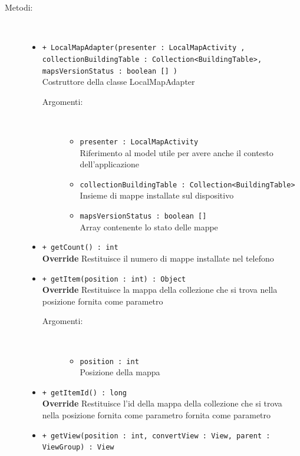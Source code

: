 \documentclass[../DefinizioneDiProdotto.tex]{subfiles}
\begin{document}
\begin{description}
\begin{itemize}
	\end{itemize}
	\item[Metodi:] \
	\begin{itemize}
		\item \texttt{+ LocalMapAdapter(presenter : LocalMapActivity ,\\ collectionBuildingTable : Collection<BuildingTable>,\\ mapsVersionStatus : boolean [] )}\\
		Costruttore della classe LocalMapAdapter
		\begin{description}
			\item[Argomenti:] \
			\begin{itemize}
				\item \texttt{presenter : LocalMapActivity }\\
				Riferimento al model utile per avere anche il contesto dell'applicazione\item \texttt{collectionBuildingTable : Collection<BuildingTable>}\\
				Insieme di mappe installate sul dispositivo\item \texttt{mapsVersionStatus : boolean [] }\\
				Array contenente lo stato delle mappe\end{itemize}
		\end{description}
		\item \texttt{+ getCount() : int}\\
		\textbf{Override} Restituisce il numero di mappe installate nel telefono
		\item \texttt{+ getItem(position : int) : Object}\\
		\textbf{Override} Restituisce la mappa della collezione che si trova nella posizione fornita come parametro
		\begin{description}
			\item[Argomenti:] \
			\begin{itemize}
				\item \texttt{position : int}\\
				Posizione della mappa\end{itemize}
		\end{description}
		\item \texttt{+ getItemId() : long}\\
		\textbf{Override} Restituisce l'id della mappa della collezione che si trova nella posizione fornita come parametro fornita come parametro
		\item \texttt{+ getView(position : int, convertView : View, parent : ViewGroup) : View}\\

\end{itemize}
\end{description}
\end{document}
